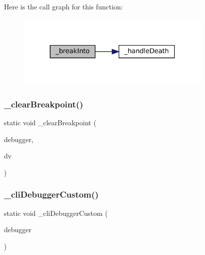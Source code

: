 Here is the call graph for this function\+:
\nopagebreak
\begin{figure}[H]
\begin{center}
\leavevmode
\includegraphics[width=268pt]{debugger_2cli-debugger_8c_ae3b40515b8220fab94d8b674d572a630_cgraph}
\end{center}
\end{figure}
\mbox{\label{debugger_2cli-debugger_8c_add7707dc6faa04d636e11df0566a18f3}} 
\subsubsection{\texorpdfstring{\+\_\+clear\+Breakpoint()}{\_clearBreakpoint()}}
{\footnotesize\ttfamily static void \+\_\+clear\+Breakpoint (\begin{DoxyParamCaption}\item[{struct C\+L\+I\+Debugger $\ast$}]{debugger,  }\item[{struct C\+L\+I\+Debug\+Vector $\ast$}]{dv }\end{DoxyParamCaption})\hspace{0.3cm}{\ttfamily [static]}}

\mbox{\label{debugger_2cli-debugger_8c_a510220aead524d147cc3f8877336c028}} 
\subsubsection{\texorpdfstring{\+\_\+cli\+Debugger\+Custom()}{\_cliDebuggerCustom()}}
{\footnotesize\ttfamily static void \+\_\+cli\+Debugger\+Custom (\begin{DoxyParamCaption}\item[{struct m\+Debugger $\ast$}]{debugger }\end{DoxyParamCaption})\hspace{0.3cm}{\ttfamily [static]}}

